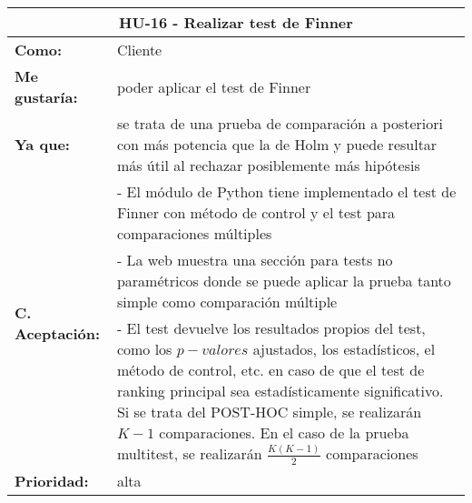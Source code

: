 \begin{table}[H]
	\begin{tabular}{| p{3cm}| p{12cm} |}
		\hline
		\multicolumn{2}{|c|}{\textbf{HU-16} - Realizar test de Finner} \\ \hline
		\textbf{Como:} & Cliente \\ \hline
		\textbf{Me gustaría:} & poder aplicar el test de Finner \\ \hline
		\textbf{Ya que:} & se trata de una prueba de comparación a posteriori con más potencia que la de Holm y puede resultar más útil al rechazar posiblemente más hipótesis \\ \hline
		\multirow{3}{12cm}{\textbf{C. Aceptación:}} & - El módulo de Python tiene implementado el test de Finner con método de control y el test para comparaciones múltiples \\
		& - La web muestra una sección para tests no paramétricos donde se puede aplicar la prueba tanto simple como comparación múltiple \\
		& - El test devuelve los resultados propios del test, como los $p-valores$ ajustados, los estadísticos, el método de control, etc. en caso de que el test de ranking principal sea estadísticamente significativo. Si se trata del POST-HOC simple, se realizarán $K-1$ comparaciones. En el caso de la prueba multitest, se realizarán $\frac{K(K-1)}{2}$ comparaciones \\ \hline
		\textbf{\textbf{Prioridad:}} & alta \\ \hline
	\end{tabular}
\end{table}


